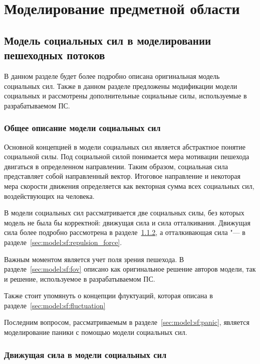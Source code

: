 \section{Моделирование предметной области}
\label{sec:model}

\subsection{Модель социальных сил в моделировании пешеходных потоков}
\label{sec:model:sf}

В данном разделе будет более подробно описана оригинальная модель социальных сил.
Также в данном разделе предложены модификации модели социальных и рассмотрены дополнительные социальные силы, используемые в разрабатываемом ПС.

\subsubsection{Общее описание модели социальных сил}
\label{sec:model:sf:description}

Основной концепцией в модели социальных сил является абстрактное понятие социальной силы.
Под социальной силой понимается мера мотивации пешехода двигаться в определенном направлении.
Таким образом, социальная сила представляет собой направленный вектор.
Итоговое направление и некоторая мера скорости движения определяется как векторная сумма всех социальных сил, воздействующих на человека.

В модели социальных сил рассматривается две социальных силы, без которых модель не была бы корректной: движущая сила и сила отталкивания.
Движущая сила более подробно рассмотрена в разделе~\ref{sec:model:sf:moving_force}, а отталкивающая сила "--- в разделе~\ref{sec:model:sf:repulsion_force}.

Важным моментом является учет поля зрения пешехода. В разделе~\ref{sec:model:sf:fov} описано как оригинальное решение авторов модели, так и решение, используемое в разрабатываемом ПС.

Также стоит упомянуть о концепции флуктуаций, которая описана в разделе~\ref{sec:model:sf:fluctuation}

Последним вопросом, рассматриваемым в разделе~\ref{sec:model:sf:panic}, является моделирование паники с помощью модели социальных сил.

\subsubsection{Движущая сила в модели социальных сил}
\label{sec:model:sf:moving_force}

